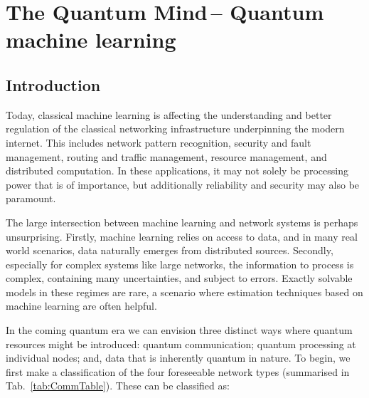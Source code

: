 %
%

\section{The Quantum Mind\texttrademark\,-- Quantum machine learning}\label{sec:quantum_mind}

\newline


  



\subsection{Introduction}

Today, classical machine learning is affecting the understanding and better regulation of the classical networking infrastructure underpinning the modern internet. This includes network pattern recognition, security and fault management, routing and traffic management, resource management, and distributed computation. In these applications, it may not solely be processing power that is of importance, but additionally reliability and security may also be paramount.

The large intersection between machine learning and network systems is perhaps unsurprising. Firstly, machine learning relies on access to data, and in many real world scenarios, data naturally emerges from distributed sources. Secondly, especially for complex systems like large networks, the information to process is complex, containing many uncertainties, and subject to errors. Exactly solvable models in these regimes are rare, a scenario where estimation techniques based on machine learning are often helpful.

In the coming quantum era we can envision three distinct ways where quantum resources might be introduced: quantum communication; quantum processing at individual nodes; and, data that is inherently quantum in nature. To begin, we first make a classification of the four foreseeable network types (summarised in Tab.~\ref{tab:CommTable}). These can be classified as:


